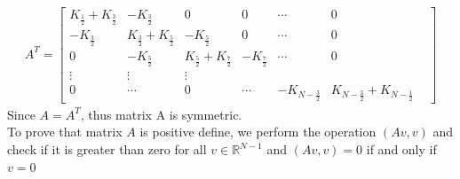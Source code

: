 \documentclass[12pt,a4paper]{article}
\newcommand{\R}{\mathbb{R}}
\begin{document}
\begin{itemize}
	\begin{align*}
	A^{T}=\begin{bmatrix}
	K_{\frac{1}{2}}+K_{\frac{3}{2}}& -K_{\frac{3}{2}}  & 0&0& \cdots&0 \\
	-K_{\frac{3}{2}}& K_{\frac{3}{2}}+K_{\frac{5}{2}}&-K_{\frac{5}{2}}&0&\cdots&0
	\\
	0&-K_{\frac{5}{2}}&K_{\frac{5}{2}}+K_{\frac{7}{2}}&-K_{\frac{7}{2}}&\cdots&0&\\
	\vdots& \vdots&\vdots\\
	0 &\cdots&0&\cdots&-K_{N-\frac{3}{2}}&K_{N-\frac{3}{2}}+K_{N-\frac{1}{2}}
	\end{bmatrix}
	\end{align*}
	Since $A=A^{T}$, thus matrix A is symmetric.\\
	\newline
	To prove that matrix $A$ is positive define, we perform the operation $(Av,v)$ and check if it is greater than zero for all $v \in \R ^{N-1}$ and $(Av,v)=0$ if and only if $v=0$
	

\end{itemize}
\end{document}
